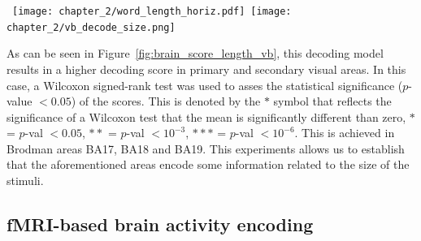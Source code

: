 
\begin{figure*}
\mbox{
{\texttt{[image: chapter\_2/word\_length\_horiz.pdf]}}
{\hspace{1cm}\texttt{[image: chapter\_2/vb\_decode\_size.png]}}
}
\caption{Cross-validation scores for the prediction of the length of words from~\citep{borghesani:hal-00986606}. The metric is Kendall tau (higher is better). In the left, the same scores are depicted for the different regions (Brodman areas). 
}\label{fig:brain_score_length_vb}
\end{figure*}


As can be seen in Figure~\ref{fig:brain_score_length_vb}, this decoding model results in a higher decoding score in primary and secondary visual areas. In this case, a Wilcoxon signed-rank test was used to asses the statistical significance ($p$-value $< 0.05$) of the scores. This is denoted by the $*$ symbol that reflects the significance of a Wilcoxon test that the mean is significantly different than zero, $*$ = $p$-val $< 0.05$, $**$ = $p$-val $< 10^{-3}$, $***$ = $p$-val $< 10^{-6}$. This is achieved in Brodman areas BA17, BA18 and BA19. This experiments allows us to establish that the aforementioned areas encode some information related to the size of the stimuli.








\subsection{fMRI-based brain activity encoding}\label{chap2_encoding}

